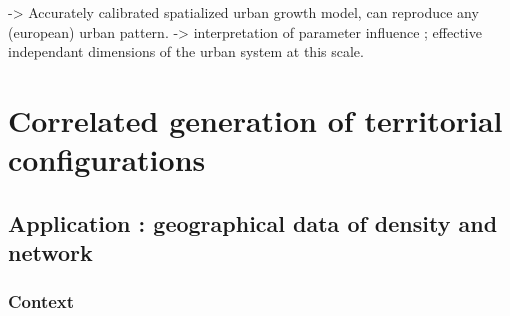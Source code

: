 


 -> Accurately calibrated spatialized urban growth model, can reproduce any (european) urban pattern.
 -> interpretation of parameter influence ; effective independant dimensions of the urban system at this scale.






















\newpage



\section{Correlated generation of territorial configurations}










\subsection{Application : geographical data of density and network}


\subsubsection{Context}


